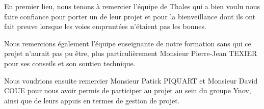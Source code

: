 \documentclass[
11pt, %
french, %
singlespacing, %
headsepline, %
]{MastersDoctoralThesis} %
\begin{document}

\begin{acknowledgements}
\addchaptertocentry{\acknowledgementname} %
En premier lieu, nous tenons à remercier l’équipe de Thales qui a bien voulu nous faire confiance
pour porter un de leur projet et pour la bienveillance dont ils ont fait preuve lorsque les voies
empruntées n’étaient pas les bonnes. \medskip

Nous remercions également l’équipe enseignante de notre formation sans qui ce projet n’aurait pas pu
être, plus particulièrement Monsieur Pierre-Jean TEXIER pour ses conseils et son soutien technique. \medskip

Nous voudrions ensuite remercier Monsieur Patick PIQUART et Monsieur David COUE pour nous avoir permis
de participer au projet au sein du groupe Ynov, ainsi que de leurs appuis en termes de gestion de projet.

\end{acknowledgements}


\tableofcontents %
\clearpage

\listoffigures %
\clearpage

\listoftables %
\clearpage






\end{document}
